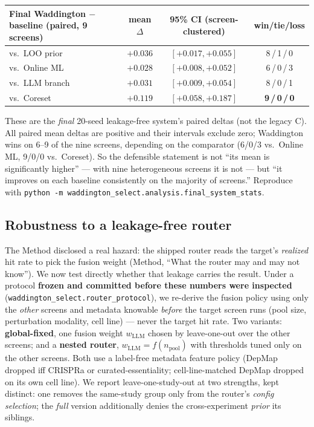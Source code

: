 \documentclass[11pt]{article}
\begin{document}
\begin{center}\small
\begin{tabular}{lccc}
\toprule
Final Waddington $-$ baseline (paired, 9 screens) & mean $\Delta$ & 95\% CI (screen-clustered) & win/tie/loss \\
\midrule
vs.\ LOO prior     & $+0.036$ & $[+0.017, +0.055]$ & 8\,/\,1\,/\,0 \\
vs.\ Online ML     & $+0.028$ & $[+0.008, +0.052]$ & 6\,/\,0\,/\,3 \\
vs.\ LLM branch    & $+0.031$ & $[+0.009, +0.054]$ & 8\,/\,0\,/\,1 \\
vs.\ Coreset       & $+0.119$ & $[+0.058, +0.187]$ & \textbf{9\,/\,0\,/\,0} \\
\bottomrule
\end{tabular}
\end{center}

\noindent
These are the \emph{final} 20-seed leakage-free system's paired deltas (not the legacy C). All paired mean
deltas are positive and their intervals exclude zero; Waddington wins on 6--9 of the nine screens,
depending on the comparator (6/0/3 vs.\ Online ML, 9/0/0 vs.\ Coreset). So the defensible statement
is not ``its mean is significantly higher'' --- with nine heterogeneous screens it is not --- but ``it
improves on each baseline consistently on the majority of screens.'' Reproduce with
\texttt{python -m waddington\_select.\allowbreak analysis.\allowbreak final\_system\_stats}.

\subsection*{Robustness to a leakage-free router}
\label{sec:honest-router}

The Method disclosed a real hazard: the shipped router reads the target's \emph{realized} hit rate to
pick the fusion weight (Method, ``What the router may and may not know''). We now test directly whether
that leakage carries the result. Under a protocol \textbf{frozen and committed before these numbers were
inspected} (\texttt{waddington\_select.router\_protocol}), we re-derive the fusion policy using only the
\emph{other} screens and metadata knowable \emph{before} the target screen runs (pool size, perturbation
modality, cell line) --- never the target hit rate. Two variants: \textbf{global-fixed}, one fusion
weight $w_{\mathrm{LLM}}$ chosen by leave-one-out over the other screens; and a \textbf{nested router},
$w_{\mathrm{LLM}}=f(n_{\mathrm{pool}})$ with thresholds tuned only on the other screens. Both use a
label-free metadata feature policy (DepMap dropped iff CRISPRa or curated-essentiality; cell-line-matched
DepMap dropped on its own cell line). We report leave-one-study-out at two strengths, kept distinct: one
removes the same-study group only from the router's \emph{config selection}; the \emph{full} version
additionally denies the cross-experiment \emph{prior} its siblings.
\end{document}

